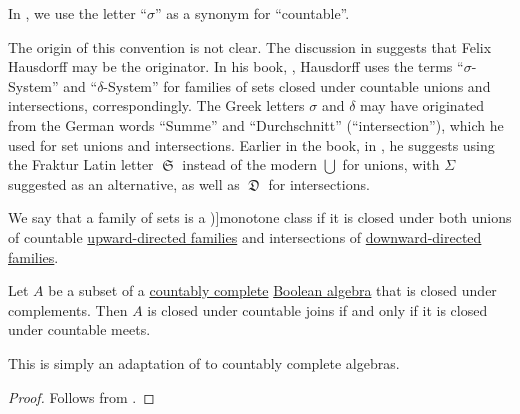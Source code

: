 \begin{remark}\label{rem:sigma_prefix_etymology}
  In , we use the letter \enquote{\( \sigma \)} as a synonym for \enquote{countable}.

  The origin of this convention is not clear. The discussion in \cite{MathOF:what_does_the_sigma_in_sigma_algebra_stand_for} suggests that Felix Hausdorff may be the originator. In his book, \cite[\S V.18]{Hausdorff1935Mengenlehre}, Hausdorff uses the terms \enquote{\( \sigma \)-System} and \enquote{\( \delta \)-System} for families of sets closed under countable unions and intersections, correspondingly. The Greek letters \( \sigma \) and \( \delta \) may have originated from the German words \enquote{Summe} and \enquote{Durchschnitt} (\enquote{intersection}), which he used for set unions and intersections. Earlier in the book, in \cite[\S I.3]{Hausdorff1962Sets}, he suggests using the Fraktur Latin letter \( \mfrakS \) instead of the modern \( \bigcup \) for unions, with \( \Sigma \) suggested as an alternative, as well as \( \mfrakD \) for intersections.
\end{remark}

\begin{definition}\label{def:monotone_class}
  We say that a family of sets is a \term[ru=монотонный класс, en=monotone class (\cite[27]{Halmos1976Measures})]{monotone class} if it is closed under both unions of countable \hyperref[def:directed_set]{upward-directed families} and intersections of \hyperref[def:directed_set]{downward-directed families}.
\end{definition}

\begin{lemma}\label{thm:boolean_subalgebra_countable_de_morgan}
  Let \( A \) be a subset of a \hyperref[def:countably_complete_lattice]{countably complete} \hyperref[def:boolean_algebra]{Boolean algebra} that is closed under complements. Then \( A \) is closed under countable joins if and only if it is closed under countable meets.
\end{lemma}
\begin{comments}
  \item This is simply an adaptation of  to countably complete algebras.
\end{comments}
\begin{proof}
  Follows from .
\end{proof}

